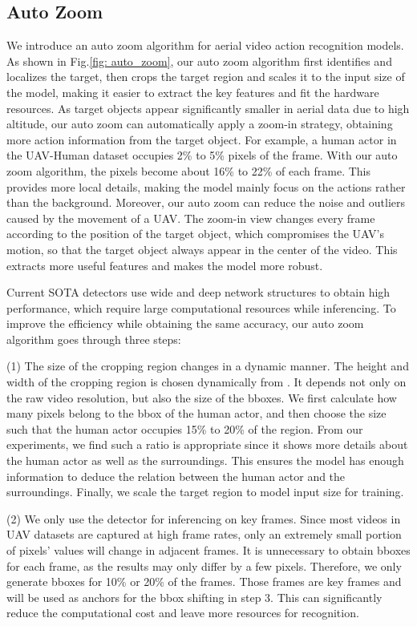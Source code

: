 \documentclass[letterpaper, 10 pt, conference]{ieeeconf}
\begin{document}
\subsection{Auto Zoom}
We introduce an auto zoom algorithm for aerial video action recognition models. As shown in Fig.\ref{fig: auto_zoom}, our auto zoom algorithm first identifies and localizes the target, then crops the target region and scales it to the input size of the model, making it easier to extract the key features and fit the hardware resources. As target objects appear significantly smaller in aerial data due to high altitude, our auto zoom can automatically apply a zoom-in strategy, obtaining more action information from the target object. For example, a human actor in the UAV-Human dataset\cite{li2021uav} occupies 2\% to 5\% pixels of the frame. With our auto zoom algorithm, the pixels become about 16\% to 22\% of each frame. This provides more local details, making the model mainly focus on the actions rather than the background.
Moreover, our auto zoom can reduce the noise and outliers caused by the movement of a UAV. The zoom-in view changes every frame according to the position of the target object, which compromises the UAV's motion, so that the target object always appear in the center of the video. This extracts more useful features and makes the model more robust.




Current SOTA detectors use wide and deep network structures to obtain high performance, which require large computational resources while inferencing. To improve the efficiency while obtaining the same accuracy, our auto zoom algorithm goes through three steps:

\noindent (1) The size of the cropping region changes in a dynamic manner. The height and width of the cropping region is chosen dynamically from . It depends not only on the raw video resolution, but also the size of the bboxes. We first calculate how many pixels belong to the bbox of the human actor, and then choose the size such that the human actor occupies 15\% to 20\% of the region. From our experiments, we find such a ratio is appropriate since it shows more details about the human actor as well as the surroundings. This ensures the model has enough information to deduce the relation between the human actor and the surroundings. Finally, we scale the target region to model input size for training.

    \noindent (2) We only use the detector for inferencing on key frames. Since most videos in UAV datasets are captured at high frame rates, only an extremely small portion of pixels' values will change in adjacent frames. It is unnecessary to obtain bboxes for each frame, as the results may only differ by a few pixels. Therefore, we only generate bboxes for 10\% or 20\% of the frames. Those frames are key frames and will be used as anchors for the bbox shifting in step 3. This can significantly reduce the computational cost and leave more resources for recognition.
    
\end{document}
